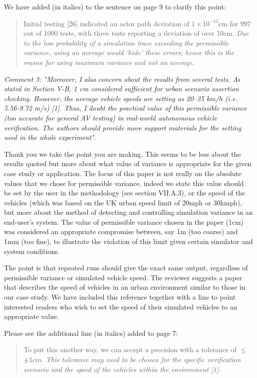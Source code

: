 \documentclass[11pt, a4paper]{letter} %
\begin{document}
\begin{letter}
We have added (in italics) to the sentence on page 9 to clarify this point:  
\begin{quote} 
Initial testing [26] indicated an actor path deviation of $1\times10^{-13}$cm for 997 out of 1000 tests, with three tests reporting a deviation of over 10cm. \textit{Due to the low probability of a simulation trace exceeding the permissible variance, using an average would `hide' these errors; hence this is the reason for using maximum variance and not an average}. 
\end{quote}

\bigskip

\textit{Comment 3: "Moreover, I also concern about the results from several tests. As stated in Section V-B, 1 cm considered sufficient for urban scenario assertion checking. However, the average vehicle speeds are setting as 20–35 km/h (i.e. 5.56-9.72 m/s) [1]. Thus, I doubt the practical value of this permissible variance (too accurate for general AV testing) in real-world autonomous vehicle verification. The authors should provide more support materials for the setting used in the whole experiment"}.

Thank you we take the point you are making. This seems to be less about the results quoted but more about what value of variance is appropriate for the given case study or application. The focus of this paper is not really on the absolute values that we chose for permissible variance, indeed we state this value should be set by the user in the methodology (see section VII.A.3), or the speed of the vehicles (which was based on the UK urban speed limit of 20mph or 30kmph), but more about the method of detecting and controlling simulation variance in an end-user's system. The value of permissible variance chosen in the paper (1cm) was considered an appropriate compromise between, say 1m (too coarse) and 1mm (too fine), to illustrate the violation of this limit given certain simulator and system conditions.

The point is that repeated runs should give the exact same output, regardless of permissible variance or simulated vehicle speed. The reviewer suggests a paper that describes the speed of vehicles in an urban environment similar to those in our case study. We have included this reference together with a line to point interested readers who wish to set the speed of their simulated vehicles to an appropriate value.

Please see the additional line (in italics) added to page 7: 
\begin{quote}
To put this another way, we can accept a precision with a tolerance of $\leq$$\pm$1$cm$. \textit{This tolerance may need to be chosen for the specific verification scenario and the speed of the vehicles within the environment [1]}.
\end{quote}



\end{letter}
\end{document}
